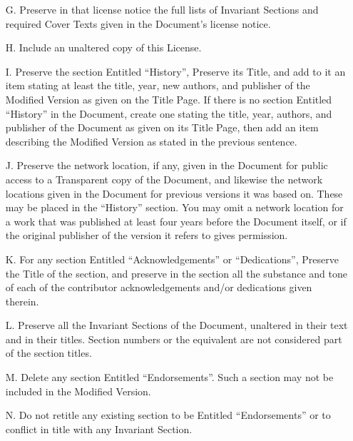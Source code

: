 \documentclass[10pt,a4paper,ngerman,titlepage,tocindentauto]{article}
\begin{document}
\begin{multicols}{3}
{\begin{itemize}
				\item[G.]
					Preserve in that license notice the full lists of Invariant Sections
					and required Cover Texts given in the Document's license notice.
					
				\item[H.]
					Include an unaltered copy of this License.
					
				\item[I.]
					Preserve the section Entitled ``History'', Preserve its Title, and add
					to it an item stating at least the title, year, new authors, and
					publisher of the Modified Version as given on the Title Page.  If
					there is no section Entitled ``History'' in the Document, create one
					stating the title, year, authors, and publisher of the Document as
					given on its Title Page, then add an item describing the Modified
					Version as stated in the previous sentence.
					
				\item[J.]
					Preserve the network location, if any, given in the Document for
					public access to a Transparent copy of the Document, and likewise
					the network locations given in the Document for previous versions
					it was based on.  These may be placed in the ``History'' section.
					You may omit a network location for a work that was published at
					least four years before the Document itself, or if the original
					publisher of the version it refers to gives permission.
					
				\item[K.]
					For any section Entitled ``Acknowledgements'' or ``Dedications'',
					Preserve the Title of the section, and preserve in the section all
					the substance and tone of each of the contributor acknowledgements
					and/or dedications given therein.
					
				\item[L.]
					Preserve all the Invariant Sections of the Document,
					unaltered in their text and in their titles.  Section numbers
					or the equivalent are not considered part of the section titles.
					
				\item[M.]
					Delete any section Entitled ``Endorsements''.  Such a section
					may not be included in the Modified Version.
					
				\item[N.]
					Do not retitle any existing section to be Entitled ``Endorsements''
					or to conflict in title with any Invariant Section.
					

\end{itemize}}
\end{multicols}
\end{document}
